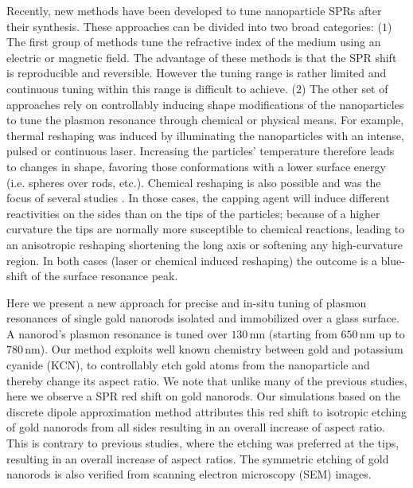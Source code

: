 \documentclass[a4paper,oneside,onecolumn]{article}
\newcommand{\nm}{\ensuremath{\,\textrm{nm}}}
\begin{document}
Recently, new methods have been developed to tune nanoparticle SPRs after their
synthesis. These approaches can be divided into two broad categories: ($1$) The
first group of methods tune the refractive index of the medium using an electric
or magnetic field\cite{Kossyrev2005}. The advantage of these methods is that the
SPR shift is reproducible and reversible. However the tuning range is rather
limited and continuous tuning within this range is difficult to achieve.
($2$) The other set of approaches rely on controllably inducing shape
modifications of the nanoparticles to tune the plasmon resonance through
chemical or physical means. For example, thermal reshaping was induced by
illuminating the nanoparticles with an intense, pulsed
\cite{Link2000}\cite{Horiguchi2008} or continuous laser\cite{Yorulmaz2012}.
Increasing the particles' temperature therefore leads to changes in shape,
favoring those conformations with a lower surface energy (i.e.
spheres over rods, etc.). Chemical reshaping is also possible and was the focus
of several studies\cite{Carbo-Argibay2007}
\cite{Rodriguez-Fernandez2005} \cite{Jana2002}. In those cases, the capping
agent will induce different reactivities on the sides than on the tips of the
particles; because of a higher curvature\cite{Yuan2015} the tips are
normally more susceptible to chemical reactions, leading to an anisotropic reshaping
shortening the long axis or softening any high-curvature region. In both cases
(laser or chemical induced reshaping) the outcome is a blue-shift of the surface
resonance peak.

Here we present a new approach for precise and in-situ tuning of plasmon
resonances of single gold nanorods isolated and immobilized over a glass
surface. A nanorod's plasmon resonance is tuned over $130\nm$ (starting from
$650\nm$ up to $780\nm$). Our method exploits well known chemistry between gold
and potassium cyanide (KCN), to controllably etch gold atoms from the
nanoparticle and thereby change its aspect ratio. We note that unlike many of
the previous studies, here we observe a SPR red shift on gold nanorods.
Our simulations based on the discrete dipole approximation method attributes
this red shift to isotropic etching of gold nanorods from all sides resulting in
an overall increase of aspect ratio. This is contrary to previous studies, where
the etching was preferred at the tips, resulting in an overall increase of
aspect ratios. The symmetric etching of gold nanorods is also verified from
scanning electron microscopy (SEM) images.
\end{document}

